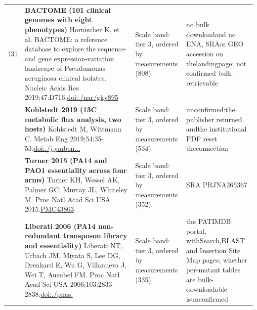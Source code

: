 \begin{landscape}
\begin{longtable}{@{}r@{\hspace{4pt}} L{78mm} L{72mm} L{76mm}@{}}
131 & \textbf{BACTOME (101 clinical genomes with eight phenotypes)} \newline Hornischer K, et al. BACTOME: a reference database to explore the sequence- and gene expression-variation landscape of Pseudomonas aeruginosa clinical isolates. Nucleic Acids Res 2019;47:D716.\newline \href{https://doi.org/10.1093/nar/gky895}{doi:./\allowbreak nar/\allowbreak gky895} & Scale band: tier 3, ordered by measurements (808). & no bulk \allowbreak download\allowbreak  and no \allowbreak ENA, SRA\allowbreak  or GEO \allowbreak accessio\allowbreak n on the\allowbreak  landing\allowbreak  page; n\allowbreak ot confi\allowbreak rmed bul\allowbreak k-\allowbreak retriev\allowbreak able \\
 & \textbf{Kohlstedt 2019 (13C metabolic flux analysis, two hosts)} \newline Kohlstedt M, Wittmann C. Metab Eng 2019;54:35-53.\newline \href{https://doi.org/10.1016/j.ymben.2019.01.008}{doi:./\allowbreak j.\allowbreak ymben...} & Scale band: tier 3, ordered by measurements (534). & unconfir\allowbreak med:\allowbreak  the pu\allowbreak blisher \allowbreak returned and\allowbreak  the ins\allowbreak titution\allowbreak al PDF r\allowbreak eset the\allowbreak  connect\allowbreak ion \\
 & \textbf{Turner 2015 (PA14 and PAO1 essentiality across four arms)} \newline Turner KH, Wessel AK, Palmer GC, Murray JL, Whiteley M. Proc Natl Acad Sci USA 2015.\newline \href{https://pmc.ncbi.nlm.nih.gov/articles/PMC4386324}{PMC43863} & Scale band: tier 3, ordered by measurements (352). & SRA PRJN\allowbreak A265367 \\
 & \textbf{Liberati 2006 (PA14 non-redundant transposon library and essentiality)} \newline Liberati NT, Urbach JM, Miyata S, Lee DG, Drenkard E, Wu G, Villanueva J, Wei T, Ausubel FM. Proc Natl Acad Sci USA 2006;103:2833-2838.\newline \href{https://doi.org/10.1073/pnas.0511100103}{doi:./\allowbreak pnas.} & Scale band: tier 3, ordered by measurements (335). & the PATI\allowbreak MDB port\allowbreak al, with\allowbreak  Search,\allowbreak  BLAST a\allowbreak nd Inser\allowbreak tion Sit\allowbreak e Map pa\allowbreak ges; whe\allowbreak ther per\allowbreak -\allowbreak mutant \allowbreak tables a\allowbreak re bulk-\allowbreak downloa\allowbreak dable is\allowbreak  unconfi\allowbreak rmed \\

\end{longtable}
\end{landscape}
